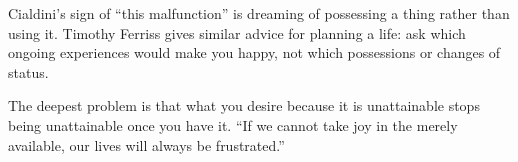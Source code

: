 Cialdini's sign of ``this malfunction'' is dreaming of possessing a thing rather than using it. Timothy Ferriss gives similar advice for planning a life: ask which ongoing experiences would make you happy, not which possessions or changes of status. 

The deepest problem is that what you desire because it is unattainable stops being unattainable once you have it. ``If we cannot take joy in the merely available, our lives will always be frustrated.''
